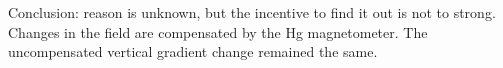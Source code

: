 Conclusion: reason is unknown, but the incentive to find it out is not to strong. Changes in the field are compensated by the Hg magnetometer. The uncompensated vertical gradient change remained the same.











